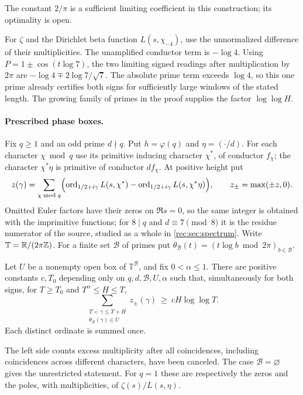 The constant $2/\pi$ is a sufficient limiting coefficient in this construction; its
optimality is open.

\begin{example}\label{zer:ex:seven}
For $\zeta$ and the Dirichlet beta function $L(s,\chi_{-4})$, use the unnormalized
difference of their multiplicities. The unamplified conductor term is $-\log4$. Using
$P=1\pm\cos(t\log7)$, the two limiting signed readings after multiplication by $2\pi$ are
$-\log4\mp2\log7/\sqrt7$. The absolute prime term exceeds $\log4$, so this one prime
already certifies both signs for sufficiently large windows of the stated length. The
growing family of primes in the proof supplies the factor $\log\log H$.
\end{example}

\paragraph{Prescribed phase boxes.}
Fix $q\ge1$ and an odd prime $d\nmid q$. Put $h=\varphi(q)$ and $\eta=(\cdot/d)$. For each
character $\chi\bmod q$ use its primitive inducing character $\chi^*$, of conductor
$f_\chi$; the character $\chi^*\eta$ is primitive of conductor $df_\chi$. At positive height
put
\[
 z(\gamma)=\sum_{\chi\bmod q}\Bigl(\operatorname{ord}_{1/2+i\gamma}L(s,\chi^*)
   -\operatorname{ord}_{1/2+i\gamma}L(s,\chi^*\eta)\Bigr),\qquad z_\pm=\max(\pm z,0).
\]
Omitted Euler factors have their zeros on $\Re s=0$, so the same integer is obtained with
the imprimitive functions; for $8\mid q$ and $d\equiv7\pmod8$ it is the residue numerator of
the source, studied as a whole in \cref{rec:sec:spectrum}. Write $\mathbb T=\mathbb{R}/(2\pi\mathbb{Z})$. For a
finite set $\mathcal B$ of primes put
$\theta_{\mathcal B}(t)=(t\log b\bmod2\pi)_{b\in\mathcal B}$.

\begin{theorem}[\stG]\label{zer:thm:phasebox}
Let $U$ be a nonempty open box of $\mathbb T^{\mathcal B}$, and fix $0<\alpha\le1$. There
are positive constants $c,T_0$ depending only on $q,d,\mathcal B,U,\alpha$ such that,
simultaneously for both signs, for $T\ge T_0$ and $T^\alpha\le H\le T$,
\begin{equation}\label{zer:eq:phase}
 \sum_{\substack{T<\gamma\le T+H\\\theta_{\mathcal B}(\gamma)\in U}}z_\pm(\gamma)\ \ge\
 cH\log\log T .
\end{equation}
Each distinct ordinate is summed once.
\end{theorem}

The left side counts excess multiplicity after all coincidences, including coincidences
across different characters, have been canceled. The case $\mathcal B=\varnothing$ gives
the unrestricted statement. For $q=1$ these are respectively the zeros and the poles, with
multiplicities, of $\zeta(s)/L(s,\eta)$.


